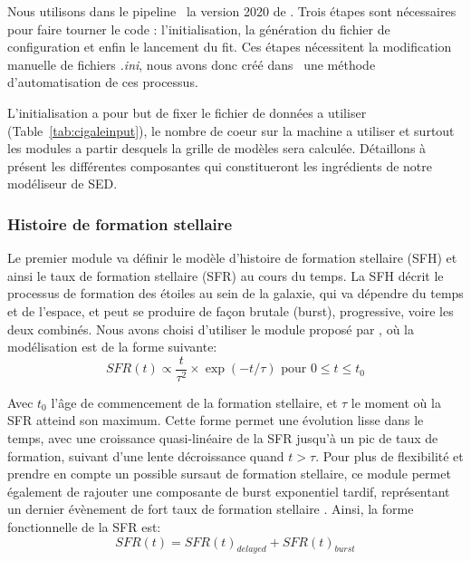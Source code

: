 \documentclass[../main/main.tex]{subfiles}
\begin{document}
Nous utilisons dans le pipeline \hypergal\ la version 2020 de \cigale. Trois étapes sont nécessaires pour faire tourner le code : l'initialisation, la génération du fichier de configuration et enfin le lancement du fit. Ces étapes nécessitent la modification manuelle de fichiers \textit{.ini}, nous avons donc créé dans \hypergal\ une méthode d'automatisation de ces processus.

L'initialisation a pour but de fixer le fichier de données a utiliser (Table~\ref{tab:cigaleinput}), le nombre de coeur sur la machine a utiliser et surtout les modules a partir desquels la grille de modèles sera calculée. Détaillons à présent les différentes composantes qui constitueront les ingrédients de notre modéliseur de SED.

\subsubsection{Histoire de formation stellaire}

Le premier module va définir le modèle d'histoire de formation stellaire (SFH) et ainsi le taux de formation stellaire (SFR) au cours du temps. La SFH décrit le processus de formation des étoiles au sein de la galaxie, qui va dépendre du temps et de l'espace,  et peut se produire de façon brutale (burst), progressive, voire les deux combinés. Nous avons choisi d'utiliser le module \textbf{} proposé par \cigale, où la modélisation est de la forme suivante:
\begin{equation}
  \label{eq:sfhdelayed}
  SFR(t)\propto \frac{t}{\tau^2}\times\exp(-t/\tau) \text{ pour $0\le t\le t_0$}
\end{equation}

Avec $t_0$ l'âge de commencement de la formation stellaire, et $\tau$ le moment où la SFR atteind son maximum. Cette forme permet une évolution lisse dans le temps, avec une croissance quasi-linéaire de la SFR jusqu'à un pic de taux de formation, suivant d'une lente décroissance quand $t>\tau$.
Pour plus de flexibilité et prendre en compte un possible sursaut de formation stellaire, ce module permet également de rajouter une composante de burst exponentiel tardif, représentant un dernier évènement de fort taux de formation stellaire \citep{Malek2018}.
Ainsi, la forme fonctionnelle de la SFR est:
\begin{equation}
  \label{eq:sfhdelayedburst}
  SFR(t) = SFR(t)_{delayed} + SFR(t)_{burst}
\end{equation}
\end{document}
